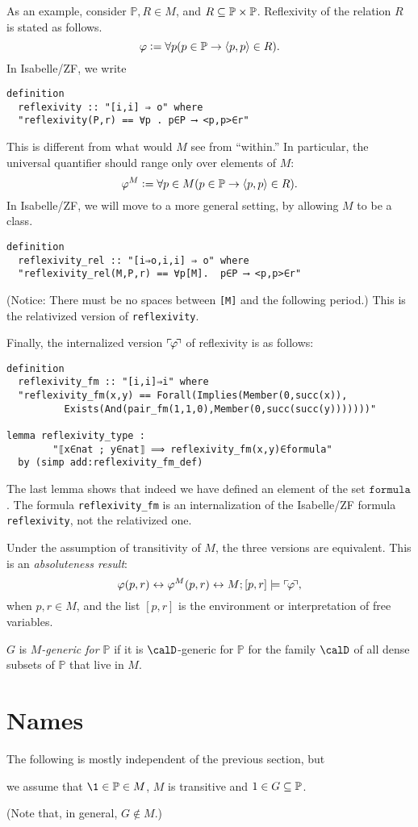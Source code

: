 \documentclass[11pt,english]{article}
\renewcommand{\PP}{\mathbb{P}}
\newcommand{\formula}{\ensuremath{\mathtt{formula}}}
\begin{document}
As an example, consider $\PP,R \in M$,  and $R\sbq
\PP\times\PP$. Reflexivity of the relation $R$ is 
stated as follows.
\[
\phi\defi \forall p (p\in \PP \limp \lb p,p\rb \in R).
\]
In Isabelle/ZF, we write
%
\begin{verbatim}
definition 
  reflexivity :: "[i,i] ⇒ o" where
  "reflexivity(P,r) == ∀p . p∈P ⟶ <p,p>∈r"
\end{verbatim}

This is different from what would $M$ see from ``within.'' In
particular, the universal quantifier should range only over elements
of $M$:
\[
\phi^M\defi\forall p\in M (p\in \PP \limp \lb p,p\rb \in R).
\]
In Isabelle/ZF, we will move to a more general setting, by allowing
 $M$ to be a class.
\begin{verbatim}
definition  
  reflexivity_rel :: "[i⇒o,i,i] ⇒ o" where
  "reflexivity_rel(M,P,r) == ∀p[M].  p∈P ⟶ <p,p>∈r"
\end{verbatim}
(Notice: There must be no spaces between \verb|[M]| and the following
period.) This is the relativized version of
\verb|reflexivity|. 

Finally, the internalized version $\ulcorner{\!\varphi\!}\urcorner$ of reflexivity is as
follows: 
\begin{verbatim}
definition
  reflexivity_fm :: "[i,i]⇒i" where
  "reflexivity_fm(x,y) == Forall(Implies(Member(0,succ(x)),
          Exists(And(pair_fm(1,1,0),Member(0,succ(succ(y)))))))"

lemma reflexivity_type : 
        "⟦x∈nat ; y∈nat⟧ ⟹ reflexivity_fm(x,y)∈formula"
  by (simp add:reflexivity_fm_def)
\end{verbatim}

The last lemma shows that indeed we have defined an element of the set
\formula. The formula \verb|reflexivity_fm| is an internalization of
the Isabelle/ZF formula \verb|reflexivity|, not the relativized
one.

Under the assumption of transitivity of $M$, the three versions are
equivalent. This is an \emph{absoluteness result}:
\[
\varphi(p,r) \leftrightarrow \varphi^M(p,r) \leftrightarrow M;[p,r]\models\ulcorner{\!\varphi\!}\urcorner,
\]
when $p,r\in M$, and the list $[p,r]$ is the environment or
interpretation of free variables. 

\begin{definition}
  $G$ is \emph{$M$-generic for $\PP$} if it is $\calD$-generic for
  $\PP$ for the family $\calD$ of all dense subsets of $\PP$ that live
  in $M$.
\end{definition}

\section{Names}
\begin{framed}
  The following is mostly independent of the previous section, but %
  \begin{bfseries}%
    we assume that $\1\in\PP\in M$, $M$ is transitive and 
    $1\in G\sbq\PP$.
  \end{bfseries}
  (Note that, in general, $G\notin M$.)
\end{framed}
\end{document}
